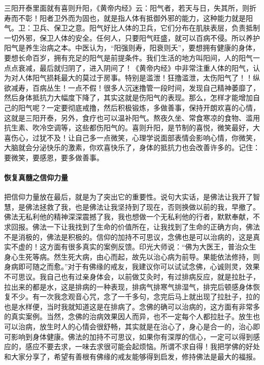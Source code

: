 三阳开泰里面就有喜则升阳，《黄帝内经》云：阳气者，若天与日，失其所，则折寿而不彰！阳者卫外而为固也，就是指人体有抵御外邪的能力，这种能力就是阳气。卫：卫兵、保卫之意。阳气好比人体的卫兵，它们分布在肌肤表层，负责抵制一切外邪，保卫人体的安全。任何人，只要阳气旺盛，就可以百病不侵。所以养护阳气是养生治病之本。中医认为，“阳强则寿，阳衰则夭”，要想拥有健康的身体，要想长命百岁，拥有充足的阳气是前提条件。我们生活的地方叫阳间，人的阳气一点点衰减，最后就归阴了，进入阴间了！《黄帝内经》中非常注重人体的阳气，认为对人体阳气损耗最大的莫过于房事。特别是滥泄！狂撸滥泄，太伤阳气了！！纵欲减寿，百病丛生！一点不假！很多人沉迷撸管一段时间，发现自己精神萎靡了，然后身体抵抗力大幅度下降了，其实这就是伤阳气的表现。那么，怎样才能增加自己的阳气呢？一定要彻底戒撸，然后积极锻炼，多做善事，保持开朗欢喜的心情，这就是三阳开泰，另外，食疗也可以温补阳气。熬夜久坐、常食寒凉的食物、滥用抗生素、吹冷空调等，这些都伤阳气的。喜则升阳，是节制的喜悦，微笑最好，大喜伤心，过犹不及！让自己多一点微笑，心理学说面部表情会影响心情，你微笑，大脑就会分泌快乐的激素，你欢喜快乐了，身体的抵抗力也会改善许多的。记住：要微笑，要感恩，要多做善事。

\paragraph{恢复真髓之信仰力量}

把信仰力量放在最后，就是为了突出它的重要性。说句大实话，是佛法让我开了智慧，是佛法拯救了我，也是佛法让我坚持到了现在，否则换做以前的我，早撤了。佛法无私利他的精神深深震撼了我，我也想做一个无私利他的行者，默默奉献，不求回报。佛法一下让我找到了生命的价值所在，让我找到了生命的正确方向，佛法不是消极的，佛法是积极的。信仰的加持不可思议，念佛也是可以治病的，这是真实不虚的！这方面有很多真实的案例反馈。印光大师说：“佛为大医王，普治众生身心生死等病。然生死大病，由心而起，故先以治心病为前导。果能依法修持，则身病即可随之而愈。”对于有佛缘的戒友，我建议你可以试试念佛，心诚则灵，效果不可思议。我自己也有过亲身体会，以前做艾灸时，有过排病反应，就是拉肚子，拉出来的都是水，这是排病的一种表现，排病气排寒气排湿气，排完后顿感身体恢复不少。有一次我念观音心咒，念了一千多句，念完后马上就出现了拉肚子，拉的也是水样便，当时我就知道这是在排病了。念佛的确可以治病的，这方面有非常多的真实案例。当然，念佛的治病效果因人而异，也不一定每个人都拉肚子。放生也可以治病，放生时人的心情会很舒畅，其实就是在治心了，身心是合一的，治心即可影响到身体健康。佛法的加持不可思议，如果你有深厚的信心，一定可以得到感应的，感应不要去求，一味去求很可能会起烦恼。所谓不求自得！我把学佛的好处和大家分享了，希望有善根有佛缘的戒友能够得到启发，修持佛法是最大的福报。

